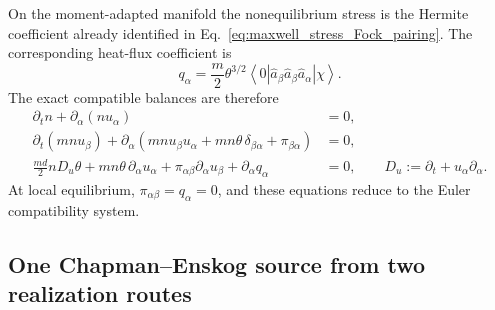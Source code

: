 \documentclass[11pt,oneside]{article}
\numberwithin{equation}{section}
\theoremstyle{definition}
\begin{document}
On the moment-adapted manifold the nonequilibrium stress is the Hermite coefficient already identified in Eq.~\eqref{eq:maxwell_stress_Fock_pairing}.  The corresponding heat-flux coefficient is
\begin{equation}
q_\alpha
=\frac{m}{2}\theta^{3/2}
\left\langle0\left|\hat a_\beta\hat a_\beta\hat a_\alpha\right|\chi\right\rangle .
\label{eq:maxwell_heat_Fock_pairing}
\end{equation}
The exact compatible balances are therefore
\begin{align}
\partial_t n+\partial_\alpha(nu_\alpha)&=0,
\label{eq:maxwell_continuity}
\\
\partial_t(mnu_\beta)
+\partial_\alpha\!\left(mnu_\beta u_\alpha+mn\theta\,\delta_{\beta\alpha}+\pi_{\beta\alpha}\right)&=0,
\label{eq:maxwell_momentum_balance}
\\
\frac{md}{2}nD_u\theta
+mn\theta\,\partial_\alpha u_\alpha
+\pi_{\alpha\beta}\partial_\alpha u_\beta
+\partial_\alpha q_\alpha&=0,
\qquad D_u:=\partial_t+u_\alpha\partial_\alpha.
\label{eq:maxwell_temperature_balance}
\end{align}
At local equilibrium, $\pi_{\alpha\beta}=q_\alpha=0$, and these equations reduce to the Euler compatibility system.

\subsection{One Chapman--Enskog source from two realization routes}
\label{subsec:maxwell_CE1}
\end{document}
